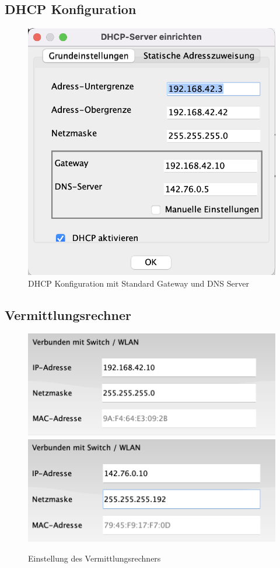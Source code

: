 \documentclass{article}
\begin{document}
	\subsection{DHCP Konfiguration}
	\begin{figure}[H]
	\centering
	\includegraphics[scale=0.5]{1.3.png}
	\caption{DHCP Konfiguration mit Standard Gateway und DNS Server}
	\end{figure}
	\subsection{Vermittlungsrechner}
	\begin{figure}[H]
	\centering
	\includegraphics[scale=0.4]{2.31.png}
	\includegraphics[scale=0.4]{2.32.png}
	\caption{Einstellung des Vermittlungsrechners}
	\end{figure}
\end{document}

